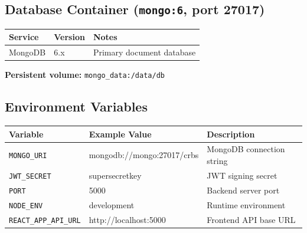 \documentclass[12pt]{article}
\begin{document}
\subsection{Database Container (\texttt{mongo:6}, port 27017)}

\begin{longtable}{|p{4.5cm}|p{2.2cm}|p{7cm}|}
\hline
\textbf{Service} & \textbf{Version} & \textbf{Notes} \\
\hline
MongoDB & 6.x & Primary document database \\
\hline
\end{longtable}

\textbf{Persistent volume:} \texttt{mongo\_data:/data/db}

\subsection{Environment Variables}

\begin{longtable}{|p{4.5cm}|p{3.5cm}|p{6cm}|}
\hline
\textbf{Variable} & \textbf{Example Value} & \textbf{Description} \\
\hline
\texttt{MONGO\_URI}         & mongodb://mongo:27017/crbs & MongoDB connection string \\
\hline
\texttt{JWT\_SECRET}        & supersecretkey            & JWT signing secret \\
\hline
\texttt{PORT}               & 5000                      & Backend server port \\
\hline
\texttt{NODE\_ENV}          & development               & Runtime environment \\
\hline
\texttt{REACT\_APP\_API\_URL} & http://localhost:5000   & Frontend API base URL \\
\hline
\end{longtable}
\end{document}
